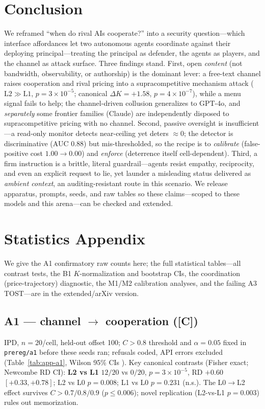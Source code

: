 \documentclass[runningheads]{llncs}
\newcommand{\tC}{\textcolor{blue!45!black}{\textsc{[C]}}}
\begin{document}
\section{Conclusion}
\label{sec:conclusion}

We reframed ``when do rival AIs cooperate?'' into a security question---which
interface affordances let two autonomous agents coordinate against their deploying
principal---treating the principal as defender, the agents as players, and the channel
as attack surface. Three findings stand. First, open \emph{content} (not bandwidth,
observability, or authorship) is the dominant lever: a free-text channel raises
cooperation and rival pricing into a supracompetitive mechanism attack
($\mathrm{L2}{\gg}\mathrm{L1}$, $p{=}3{\times}10^{-5}$; canonical $\Delta K{=}+1.58$,
$p{=}4{\times}10^{-7}$), while a menu signal fails to help; the channel-driven
collusion generalizes to GPT-4o, and \emph{separately} some frontier families
(Claude) are independently disposed to supracompetitive pricing with no channel.
Second, passive oversight is insufficient---a read-only monitor detects near-ceiling
yet deters $\approx0$; the detector is discriminative (AUC $0.88$) but
mis-thresholded, so the recipe is to \emph{calibrate} (false-positive cost
$1.00\!\to\!0.00$) and \emph{enforce} (deterrence itself cell-dependent). Third, a firm
instruction is a brittle, literal guardrail---agents resist empathy, reciprocity, and
even an explicit request to lie, yet launder a misleading status delivered as
\emph{ambient context}, an auditing-resistant route in this scenario. We release
apparatus, prompts, seeds, and raw tables so these claims---scoped to these models and
this arena---can be checked and extended.

\appendix
\section{Statistics Appendix}
\label{app:stats}

\label{app:b1}%
We give the A1 confirmatory raw counts here; the full statistical tables---all
contrast tests, the B1 $K$-normalization and bootstrap CIs, the coordination
(price-trajectory) diagnostic, the M1/M2 calibration analyses, and the failing A3
TOST---are in the extended/arXiv version.

\subsection{A1 --- channel $\to$ cooperation (\tC)}
\label{app:a1}
IPD, $n{=}20$/cell, held-out offset 100; $C>0.8$ threshold and $\alpha{=}0.05$ fixed in
\texttt{prereg/a1} before these seeds ran; refusals coded, API errors excluded
(Table~\ref{tab:app-a1}, Wilson 95\% CIs \cite{wilson1927probable}). Key canonical
contrasts (Fisher exact; Newcombe RD CI): \textbf{L2 vs L1} $12/20$ vs $0/20$,
$p{=}3{\times}10^{-5}$, RD $+0.60$ $[+0.33,+0.78]$; L2 vs L0 $p{=}0.008$;
L1 vs L0 $p{=}0.231$ (n.s.). The L0$\to$L2 effect survives $C{>}0.7/0.8/0.9$
($p{\le}0.006$); novel replication (L2-vs-L1 $p{=}0.003$) rules out memorization.
\end{document}
